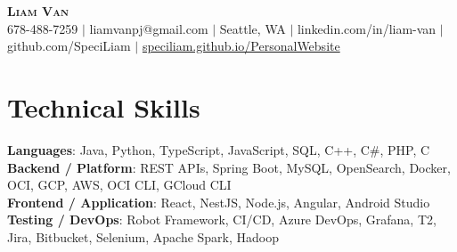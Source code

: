 \documentclass[letterpaper,11pt]{article}
\begin{document}

%
\begin{center}
    \textbf{\Huge \scshape Liam Van} \\ \vspace{1pt}
    \small 678-488-7259 $|$ \small {liamvanpj@gmail.com} $|$ Seattle, WA
 {{$|$ linkedin.com/in/liam-van} {$|$ github.com/SpeciLiam} {$|$ \href{https://speciliam.github.io/PersonalWebsite}{speciliam.github.io/PersonalWebsite}}}

\end{center}

\section{Technical Skills}
 \begin{itemize}[leftmargin=0.15in, label={}]
    \small{\item{
     \textbf{Languages}{: Java, Python, TypeScript, JavaScript, SQL, C++, C\#, PHP, C} \\
     \textbf{Backend / Platform}{: REST APIs, Spring Boot, MySQL, OpenSearch, Docker, OCI, GCP, AWS, OCI CLI, GCloud CLI} \\
     \textbf{Frontend / Application}{: React, NestJS, Node.js, Angular, Android Studio} \\
     \textbf{Testing / DevOps}{: Robot Framework, CI/CD, Azure DevOps, Grafana, T2, Jira, Bitbucket, Selenium, Apache Spark, Hadoop} \\
    }}
 \end{itemize}
%
\end{document}
